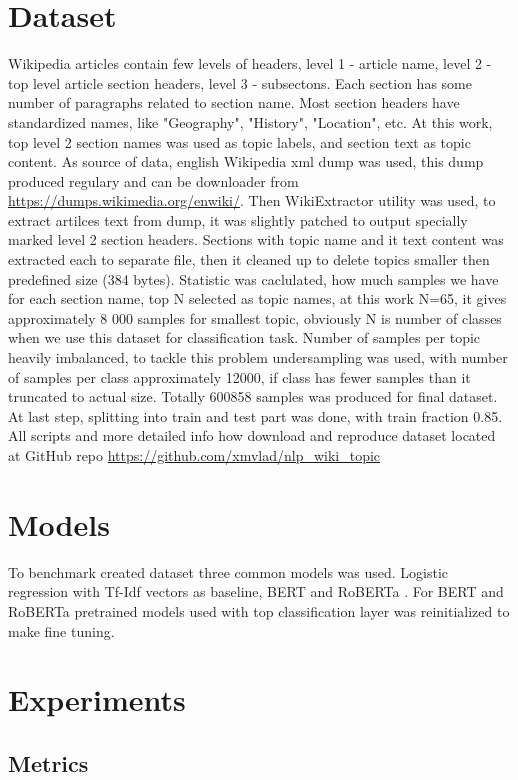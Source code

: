 \documentclass{article}
\begin{document}
\section{Dataset}
Wikipedia articles contain few levels of headers, level 1 - article name, level 2 - top level article section headers, level 3 - subsectons. Each section has some number of paragraphs related to section name. Most section headers have standardized names, like "Geography", "History", "Location", etc. 
At this work, top level 2 section names was used as topic labels, and section text as topic content. As source of data, english Wikipedia xml dump was used, this dump produced regulary and can be downloader from \url{https://dumps.wikimedia.org/enwiki/}. Then WikiExtractor utility was used, to extract artilces text from dump,
it was slightly patched to output specially marked level 2 section headers. Sections with topic name and it text content was extracted each to separate file, then it cleaned up to delete topics smaller then predefined size (384 bytes). Statistic was caclulated, how much samples we have for each section name,
top N selected as topic names, at this work N=65, it gives approximately 8 000 samples for smallest topic, obviously N is number of classes when we use this dataset for classification task. Number of samples per topic heavily imbalanced, to tackle this problem undersampling was used, with number of samples per class approximately 12000,
if class has fewer samples than it truncated to actual size. Totally 600858 samples was produced for final dataset. At last step, splitting into train and test part was done, with train fraction 0.85. All scripts and more detailed info how download and reproduce dataset located at GitHub repo \url{https://github.com/xmvlad/nlp_wiki_topic}

\section{Models}
To benchmark created dataset three common models was used. Logistic regression with Tf-Idf vectors as baseline, BERT \cite{Devlin2018} and RoBERTa \cite{yinhan2019roberta}. For BERT and RoBERTa pretrained models used with top classification layer was reinitialized to make fine tuning.

\section{Experiments}

\subsection{Metrics}
\end{document}
